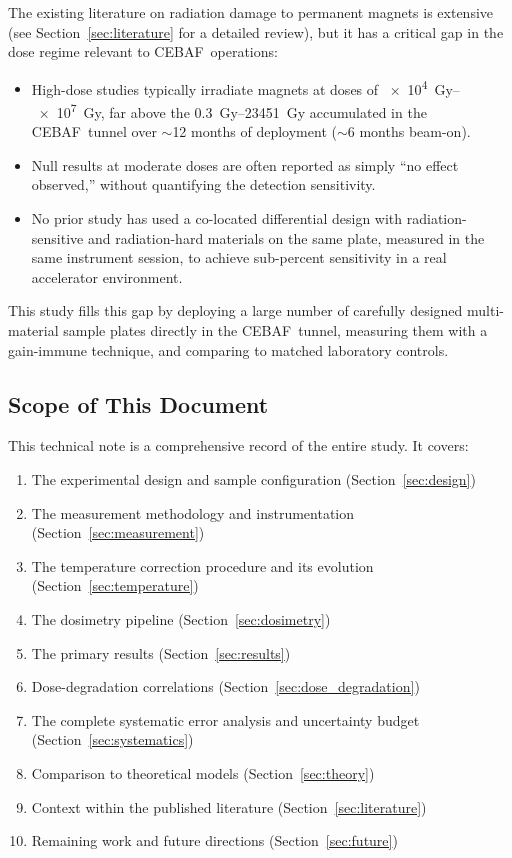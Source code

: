 \documentclass[11pt,letterpaper]{article}
\newcommand{\CEBAF}{CEBAF}
\begin{document}
The existing literature on radiation damage to permanent magnets is extensive
(see Section~\ref{sec:literature} for a detailed review), but it has a critical
gap in the dose regime relevant to \CEBAF~operations:

\begin{itemize}
    \item High-dose studies \cite{Simos2018,Bizen2016,Alderman,Miyahara}
    typically irradiate magnets at doses of
    \SIrange{e4}{e7}{Gy}, far above the \SIrange{0.3}{23451}{Gy} accumulated
    in the \CEBAF~tunnel over $\sim$12 months of deployment ($\sim$6 months beam-on).
    \item Null results at moderate doses are often reported as simply
    ``no effect observed,'' without quantifying the detection sensitivity.
    \item No prior study has used a co-located differential design
    with radiation-sensitive and radiation-hard materials on the same plate,
    measured in the same instrument session, to achieve sub-percent sensitivity
    in a real accelerator environment.
\end{itemize}

This study fills this gap by deploying a large number of carefully designed
multi-material sample plates directly in the \CEBAF~tunnel, measuring them with
a gain-immune technique, and comparing to matched laboratory controls.

\subsection{Scope of This Document}

This technical note is a comprehensive record of the entire study. It covers:

\begin{enumerate}
    \item The experimental design and sample configuration (Section~\ref{sec:design})
    \item The measurement methodology and instrumentation (Section~\ref{sec:measurement})
    \item The temperature correction procedure and its evolution (Section~\ref{sec:temperature})
    \item The dosimetry pipeline (Section~\ref{sec:dosimetry})
    \item The primary results (Section~\ref{sec:results})
    \item Dose-degradation correlations (Section~\ref{sec:dose_degradation})
    \item The complete systematic error analysis and uncertainty budget (Section~\ref{sec:systematics})
    \item Comparison to theoretical models (Section~\ref{sec:theory})
    \item Context within the published literature (Section~\ref{sec:literature})
    \item Remaining work and future directions (Section~\ref{sec:future})
\end{enumerate}
\end{document}
